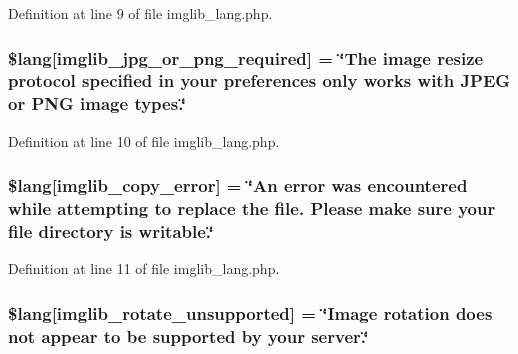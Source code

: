 Definition at line 9 of file imglib\+\_\+lang.\+php.

\subsubsection[{\texorpdfstring{\$lang}{$lang}}]{\setlength{\rightskip}{0pt plus 5cm}\$lang\mbox{[}\textquotesingle{}imglib\+\_\+jpg\+\_\+or\+\_\+png\+\_\+required\textquotesingle{}\mbox{]} = \char`\"{}The image resize protocol specified in your preferences only works with J\+P\+EG or P\+NG image types.\char`\"{}}\hypertarget{system_2language_2english_2imglib__lang_8php_a2878e2b878871cd8010970f865d70e71}{}\label{system_2language_2english_2imglib__lang_8php_a2878e2b878871cd8010970f865d70e71}


Definition at line 10 of file imglib\+\_\+lang.\+php.

\subsubsection[{\texorpdfstring{\$lang}{$lang}}]{\setlength{\rightskip}{0pt plus 5cm}\$lang\mbox{[}\textquotesingle{}imglib\+\_\+copy\+\_\+error\textquotesingle{}\mbox{]} = \char`\"{}An error was encountered while attempting to replace the file. Please make sure your file directory is writable.\char`\"{}}\hypertarget{system_2language_2english_2imglib__lang_8php_a012b6a0d2b3a8ef934e8783d2fbd6535}{}\label{system_2language_2english_2imglib__lang_8php_a012b6a0d2b3a8ef934e8783d2fbd6535}


Definition at line 11 of file imglib\+\_\+lang.\+php.

\subsubsection[{\texorpdfstring{\$lang}{$lang}}]{\setlength{\rightskip}{0pt plus 5cm}\$lang\mbox{[}\textquotesingle{}imglib\+\_\+rotate\+\_\+unsupported\textquotesingle{}\mbox{]} = \char`\"{}Image rotation does not appear to be supported by your server.\char`\"{}}\hypertarget{system_2language_2english_2imglib__lang_8php_ab1c77c6b58fc5bf8e979ab4237ec87e7}{}\label{system_2language_2english_2imglib__lang_8php_ab1c77c6b58fc5bf8e979ab4237ec87e7}


